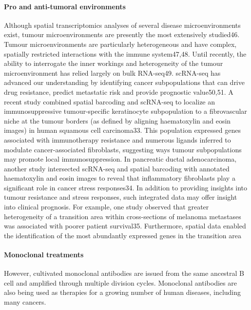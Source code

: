 \paragraph{Pro and anti-tumoral environments}
Although spatial transcriptomics analyses of several disease microenvironments exist, tumour microenvironments are presently the most extensively studied46. Tumour microenvironments are particularly heterogeneous and have complex, spatially restricted interactions with the immune system47,48. Until recently, the ability to interrogate the inner workings and heterogeneity of the tumour microenvironment has relied largely on bulk RNA-seq49. scRNA-seq has advanced our understanding by identifying cancer subpopulations that can drive drug resistance, predict metastatic risk and provide prognostic value50,51.
A recent study combined spatial barcoding and scRNA-seq to localize an immunosuppressive tumour-specific keratinocyte subpopulation to a fibrovascular niche at the tumour borders (as defined by aligning haematoxylin and eosin images) in human squamous cell carcinoma33. This population expressed genes associated with immunotherapy resistance and numerous ligands inferred to modulate cancer-associated fibroblasts, suggesting ways tumour subpopulations may promote local immunosuppression. In pancreatic ductal adenocarcinoma, another study intersected scRNA-seq and spatial barcoding with annotated haematoxylin and eosin images to reveal that inflammatory fibroblasts play a significant role in cancer stress responses34. In addition to providing insights into tumour resistance and stress responses, such integrated data may offer insight into clinical prognosis. For example, one study observed that greater heterogeneity of a transition area within cross-sections of melanoma metastases was associated with poorer patient survival35. Furthermore, spatial data enabled the identification of the most abundantly expressed genes in the transition area

\paragraph{Monoclonal treatments}

However, cultivated monoclonal antibodies are issued
from the same ancestral B cell and amplified through multiple division cycles. Monoclonal
antibodies are also being used as therapies
for a growing number of human diseases,
including many cancers.


